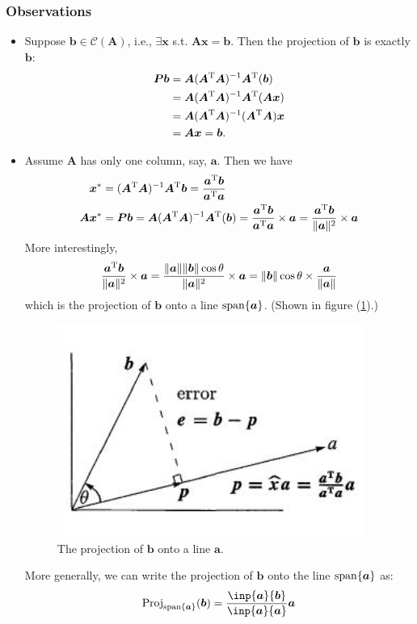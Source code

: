 \subsubsection{Observations}
\begin{itemize}
\item
Suppose $\bm b\in \mathcal{C}(\bm A)$, i.e., $\exists \bm x$ s.t. $\bm{Ax}=\bm b$. Then the projection of $\bm b$ is exactly $\bm b$:
\[
\begin{aligned}
\bm{Pb}&=\bm A(\bm A^{\mathrm T}\bm A)^{-1}\bm A^{\mathrm T}(\bm b)\\
&=\bm A(\bm A^{\mathrm T}\bm A)^{-1}\bm A^{\mathrm T}(\bm{Ax})\\
&=\bm A(\bm A^{\mathrm T}\bm A)^{-1}(\bm A^{\mathrm T}\bm A)\bm x\\
&=\bm{Ax}=\bm b.
\end{aligned}
\]
\item
Assume $\bm A$ has only one column, say, $\bm a$. Then we have
\[\begin{aligned}
\bm x^{*}&=(\bm A^{\mathrm T}\bm A)^{-1}\bm A^{\mathrm T}\bm b=\frac{\bm a^{\mathrm T}\bm b}{\bm a^{\mathrm T}\bm a}\\
\bm A\bm x^{*}&=\bm{Pb}=\bm A(\bm A^{\mathrm T}\bm A)^{-1}\bm A^{\mathrm T}(\bm b)=\frac{\bm a^{\mathrm T}\bm b}{\bm a^{\mathrm T}\bm a}\times\bm a=\frac{\bm a^{\mathrm T}\bm b}{\|\bm a\|^2}\times\bm a
\end{aligned}
\]
More interestingly, 
\[\frac{\bm a^{\mathrm T}\bm b}{\|\bm a\|^2}\times\bm a=\frac{\|\bm a\|\|\bm b\|\cos\theta}{\|\bm a\|^2}\times\bm a=\|\bm b\|\cos\theta\times\frac{\bm a}{\|\bm a\|}\]
which is the projection of $\bm b$ onto a line $\operatorname{span}\{\bm a\}$. (Shown in figure (\ref{Fig:6:3}).)
\begin{figure}[H]
\centering
\includegraphics[width=10cm]{week5/projection_line}
\caption{The projection of $\bm b$ onto a line $\bm a$.}
\label{Fig:6:3}
\end{figure}
More generally, we can write the projection of $\bm b$ onto the line $\operatorname{span}\{\bm a\}$ as:
\[
\Proj_{\Span\{\bm a\}}(\bm b)=\frac{\inp{\bm a}{\bm b}}{\inp{\bm a}{\bm a}}\bm a
\]

\end{itemize}
